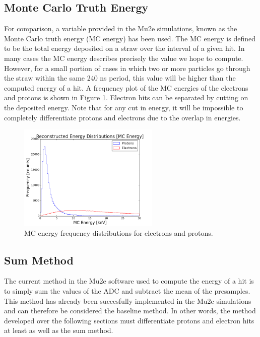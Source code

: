 \subsection{Monte Carlo Truth Energy}
For comparison, a variable provided in the Mu2e simulations, known as the Monte Carlo truth energy (MC energy) has been used. The MC energy is defined to be the total energy deposited on a straw over the interval of a given hit. In many cases the MC energy describes precisely the value we hope to compute. However, for a small portion of cases in which two or more particles go through the straw within the same 240 ns period, this value will be higher than the computed energy of a hit. A frequency plot of the MC energies of the electrons and protons is shown in Figure \ref{mcenergydistributions}. Electron hits can be separated by cutting on the deposited energy. Note that for any cut in energy, it will be impossible to completely differentiate protons and electrons due to the overlap in energies.

\begin{figure}[htp!]
    \centering
    \includegraphics[width=0.6\textwidth]{Images2/mcenergy.png}
    \caption{MC energy frequency distributions for electrons and protons.}
    \label{mcenergydistributions}
\end{figure} 


\subsection{Sum Method}

The current method in the Mu2e software used to compute the energy of a hit is to simply sum the values of the ADC and subtract the mean of the presamples. This method has already been succesfully implemented in the Mu2e simulations and can therefore be considered the baseline method. In other words, the method developed over the following sections must differentiate protons and electron hits at least as well as the sum method.


